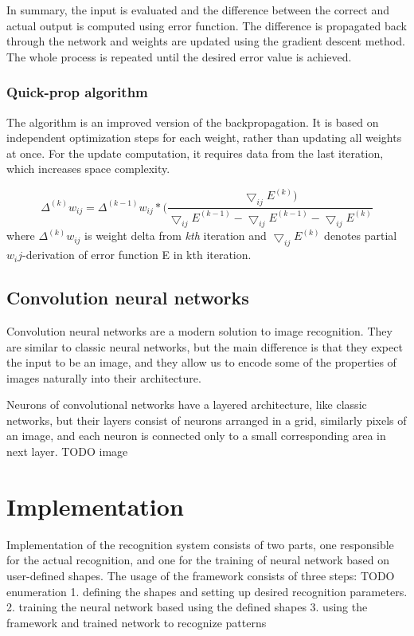 \begin{description}
In summary, the input is evaluated and the difference between the correct and actual output is computed using error function. The difference is propagated back through the network and weights are updated using the gradient descent method. The whole process is repeated until the desired error value is achieved.

\subsection{Quick-prop algorithm}
The algorithm is an improved version of the backpropagation. It is based on independent optimization steps for each weight, rather than updating all weights at once. For the update computation, it requires data from the last iteration, which increases space complexity. 

\begin{equation*}
\Delta ^{(k)} w_{ij} = \Delta^{(k-1)} w_{ij}*(\frac {\bigtriangledown_{ij} E^{(k)})} {\bigtriangledown_{ij} E^{(k-1)} - \bigtriangledown_{ij} E^(k-1) - \bigtriangledown_{ij} E^{(k)} }
\end{equation*}
where $\Delta ^{(k)} w_{ij}$ is weight delta from \emph{kth} iteration and $\bigtriangledown_{ij} E^(k)$ denotes partial $w_ij$-derivation of error function E in kth iteration.

\section{Convolution neural networks}
Convolution neural networks are a modern solution to image recognition. They are similar to classic neural networks, but the main difference is that they expect the input to be an image, and they allow us to encode some of the properties of images naturally into their architecture.

Neurons of convolutional networks have a layered architecture, like classic networks, but their layers consist of neurons arranged in a grid, similarly pixels of an image, and each neuron is connected only to a small corresponding area in next layer.  
TODO image
\chapter{Implementation}
Implementation of the recognition system consists of two parts, one responsible for the actual recognition, and one for the training of neural network based on user-defined shapes. The usage of the framework consists of three steps: TODO enumeration
1. defining the shapes and setting up desired recognition parameters.
2. training the neural network based using the defined shapes
3. using the framework and trained network to recognize patterns


\end{description}
